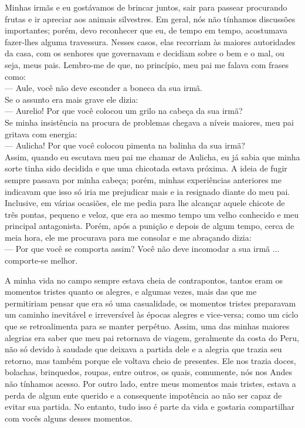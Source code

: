 Minhas irmãs e eu gostávamos de brincar juntos, sair para passear procurando frutas e ir apreciar aos animais silvestres. Em geral, nós não tínhamos discussões importantes; porém, devo reconhecer que eu, de tempo em tempo, acostumava fazer-lhes alguma travessura.
Nesses casos, elas recorriam às maiores autoridades da casa, com os senhores que governavam e decidiam sobre o bem e o mal, ou seja, meus pais. 
Lembro-me de que, no princípio, meu pai me falava com frases como:\\\indent
--- Aule, você não deve esconder a boneca da sua irmã.\\\indent
Se o assunto era mais grave ele dizia: \\\indent
--- Aurelio! Por que você colocou um grilo na cabeça da sua irmã?\\\indent
Se minha insistência na procura de problemas chegava a níveis maiores, meu pai gritava com energia:\\\indent
--- Aulicha! Por que você colocou pimenta na balinha da sua irmã?\\\indent
Assim, quando eu escutava meu pai me chamar de Aulicha, eu já sabia que minha sorte tinha sido decidida e que uma chicotada estava próxima. A ideia de fugir sempre passava por minha cabeça; porém, minhas experiências anteriores me indicavam que isso só iria me prejudicar mais e ia resignado diante do meu pai. Inclusive, em várias ocasiões, ele me pedia para lhe alcançar aquele chicote de três pontas, pequeno e veloz, que era ao mesmo tempo um velho conhecido e meu principal antagonista.
Porém, após a punição e depois de algum tempo, cerca de meia hora,
ele me procurava para me consolar e me abraçando dizia:\\\indent
--- Por que você se comporta assim? Você não deve incomodar a sua irmã ... comporte-se melhor.


A minha vida no campo sempre estava cheia de contrapontos, tantos eram os momentos tristes quanto os alegres, e algumas vezes, mais das que me permitiriam pensar que era só uma casualidade, os momentos tristes preparavam um caminho inevitável e irreversível às épocas alegres e vice-versa; como um ciclo que se retroalimenta para se manter perpétuo. 
Assim, uma das minhas maiores alegrias era saber que meu pai retornava de viagem, geralmente da costa do Peru, não só devido à saudade que deixava a partida dele e a alegria que trazia seu retorno, mas também porque ele voltava cheio de presentes. 
Ele nos trazia doces, bolachas, brinquedos, roupas, entre outros, os quais, comumente, nós nos Andes não tínhamos acesso.
Por outro lado, entre meus momentos mais tristes, estava a perda de algum ente querido e a consequente impotência ao não ser capaz de evitar sua partida. 
No entanto, tudo isso é parte da vida e gostaria compartilhar com vocês alguns desses momentos.



